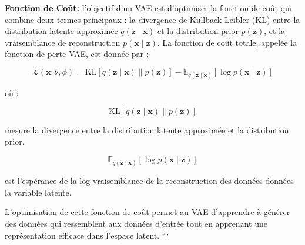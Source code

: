 \textbf{Fonction de Coût: }l'objectif d'un VAE est d'optimiser la fonction de coût qui combine deux termes principaux : la divergence de Kullback-Leibler (KL) entre la distribution latente approximée \( q(\mathbf{z} \mid \mathbf{x}) \) et la distribution prior \( p(\mathbf{z}) \), et la vraisemblance de reconstruction \( p(\mathbf{x} \mid \mathbf{z}) \). La fonction de coût totale, appelée la fonction de perte VAE, est donnée par :

\[
\mathcal{L}(\mathbf{x}; \theta, \phi) = \text{KL}\left[q(\mathbf{z} \mid \mathbf{x}) \parallel p(\mathbf{z})\right] - \mathbb{E}_{q(\mathbf{z} \mid \mathbf{x})}[\log p(\mathbf{x} \mid \mathbf{z})]
\]

où :

\[
\text{KL}\left[q(\mathbf{z} \mid \mathbf{x}) \parallel p(\mathbf{z})\right]
\]

mesure la divergence entre la distribution latente approximée et la distribution prior.

\[
\mathbb{E}_{q(\mathbf{z} \mid \mathbf{x})}[\log p(\mathbf{x} \mid \mathbf{z})]
\]

est l'espérance de la log-vraisemblance de la reconstruction des données données la variable latente.

L'optimisation de cette fonction de coût permet au VAE d'apprendre à générer des données qui ressemblent aux données d'entrée tout en apprenant une représentation efficace dans l'espace latent.
```